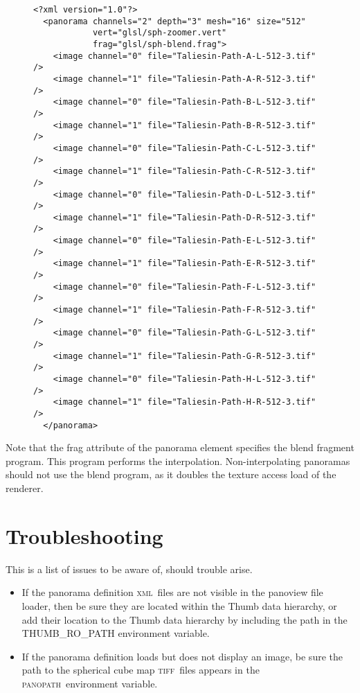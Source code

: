 \documentclass[article,twocolumn,10pt]{memoir}
\newcommand{\tiff}    {\textsc{tiff}}
\newcommand{\xml}     {\textsc{xml}}
\newcommand{\panopath}{\textsc{panopath}}
\begin{document}
\begin{Spacing}{1.1}
\begin{figure*}
\begin{verbatim}
<?xml version="1.0"?>
  <panorama channels="2" depth="3" mesh="16" size="512"
            vert="glsl/sph-zoomer.vert"
            frag="glsl/sph-blend.frag">
    <image channel="0" file="Taliesin-Path-A-L-512-3.tif" />
    <image channel="1" file="Taliesin-Path-A-R-512-3.tif" />
    <image channel="0" file="Taliesin-Path-B-L-512-3.tif" />
    <image channel="1" file="Taliesin-Path-B-R-512-3.tif" />
    <image channel="0" file="Taliesin-Path-C-L-512-3.tif" />
    <image channel="1" file="Taliesin-Path-C-R-512-3.tif" />
    <image channel="0" file="Taliesin-Path-D-L-512-3.tif" />
    <image channel="1" file="Taliesin-Path-D-R-512-3.tif" />
    <image channel="0" file="Taliesin-Path-E-L-512-3.tif" />
    <image channel="1" file="Taliesin-Path-E-R-512-3.tif" />
    <image channel="0" file="Taliesin-Path-F-L-512-3.tif" />
    <image channel="1" file="Taliesin-Path-F-R-512-3.tif" />
    <image channel="0" file="Taliesin-Path-G-L-512-3.tif" />
    <image channel="1" file="Taliesin-Path-G-R-512-3.tif" />
    <image channel="0" file="Taliesin-Path-H-L-512-3.tif" />
    <image channel="1" file="Taliesin-Path-H-R-512-3.tif" />
  </panorama>
\end{verbatim}
\end{figure*}

Note that the frag attribute of the panorama element specifies the blend fragment program. This program performs the interpolation. Non-interpolating panoramas should not use the blend program, as it doubles the texture access load of the renderer.



\section{Troubleshooting}

This is a list of issues to be aware of, should trouble arise.

\begin{itemize}
\item If the panorama definition \xml\ files are not visible in the panoview file loader, then be sure they are located within the Thumb data hierarchy, or add their location to the Thumb data hierarchy by including the path in the THUMB\_RO\_PATH environment variable.

\item If the panorama definition loads but does not display an image, be sure the path to the spherical cube map \tiff\ files appears in the \panopath\ environment variable.


\end{itemize}
\end{Spacing}
\end{document}
